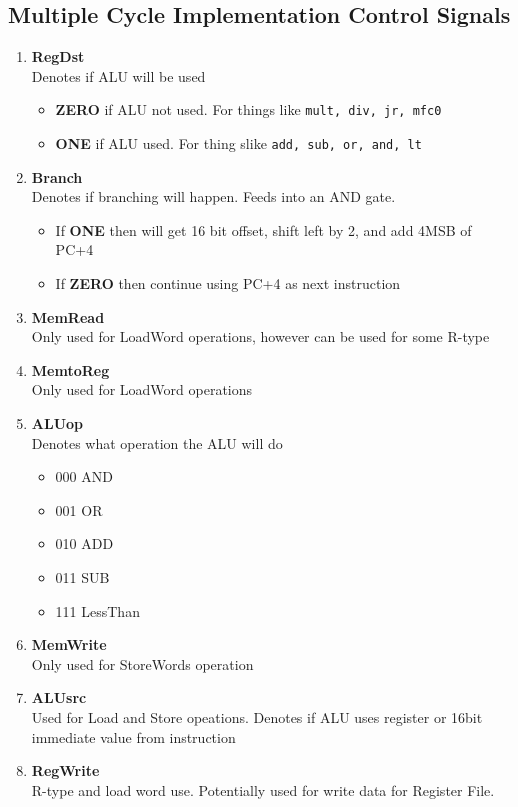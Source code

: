 \documentclass{article}
\newcommand\tab[1][0.5cm]{\hspace*{#1}}
\begin{document}
	\subsection{Multiple Cycle Implementation Control Signals}
		\begin{enumerate}
			\item \textbf{RegDst}
				\\Denotes if ALU will be used
				\begin{itemize}
					\item \textbf{ZERO} if ALU not used. For things like \texttt{mult, div, jr, mfc0}
					\item \textbf{ONE} if ALU used. For thing slike \texttt{add, sub, or, and, lt}
				\end{itemize}

			\item \textbf{Branch}
				\\Denotes if branching will happen. Feeds into an AND gate.
				\begin{itemize}
					\item If \textbf{ONE} then will get 16 bit offset, shift left by 2, and add 4MSB of PC+4
					\item If \textbf{ZERO} then continue using PC+4 as next instruction
				\end{itemize}

			\item \textbf{MemRead}
				\\Only used for LoadWord operations, however can be used for some R-type

			\item \textbf{MemtoReg}
				\\Only used for LoadWord operations

			\item \textbf{ALUop}
				\\Denotes what operation the ALU will do
				\begin{itemize}
					\item 000 \tab AND
					\item 001 \tab OR
					\item 010 \tab ADD
					\item 011 \tab SUB
					\item 111 \tab LessThan
				\end{itemize}

			\item \textbf{MemWrite}
				\\Only used for StoreWords operation

			\item \textbf{ALUsrc}
				\\Used for Load and Store opeations. Denotes if ALU uses register or 16bit immediate value from instruction

			\item \textbf{RegWrite}
				\\R-type and load word use. Potentially used for write data for Register File.
		\end{enumerate}







			
\end{document}
